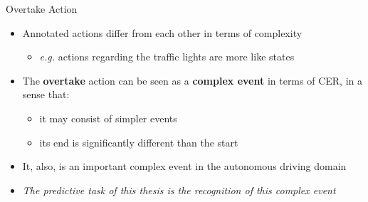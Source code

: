 \documentclass[10pt, aspectratio=169]{beamer}
\begin{document}
\begin{frame}{Overtake Action}
    \begin{itemize}
        \setlength{\itemsep}{13pt}
        \item Annotated actions differ from each other in terms of complexity
        \vspace{4pt}
        \begin{itemize}
            \item \textit{e.g.} actions regarding the traffic lights are more like states
        \end{itemize}
        \item The \textbf{overtake} action can be seen as a \textbf{complex event} in terms of CER, in a sense that:
        \vspace{0.6em}
            \begin{itemize}
            \setlength{\itemsep}{4pt}
                \item it may consist of simpler events
                \item its end is significantly different than the start
            \end{itemize}
        \item It, also, is an important complex event in the autonomous driving domain
        \item \textit{The predictive task of this thesis is the recognition of this complex event}
    \end{itemize}
\end{frame}
\end{document}
